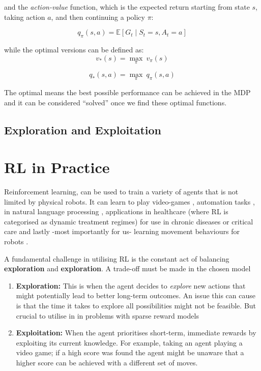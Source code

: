     and the \emph{action-value} function, which is the expected return starting from state $s$, taking action $a$, and then continuing a policy $\pi$:

    \[ q_\pi \left(s, a\right) = \mathbb{E} \left[ G_t \mid S_t = s, A_t = a\right]\]


    while the optimal versions can be defined as:
    \[v_* \left(s\right) = \underset{\pi}{\max} \ v_\pi \left(s\right)\]

    \[q_* \left(s, a\right) = \underset{\pi}{\max} \ q_\pi \left(s, a\right)\]
    
    The optimal means the best possible performance can be achieved in the MDP and it can be considered ``solved'' once we find these optimal functions.


    \subsection{Exploration and Exploitation}

\section{RL in Practice}
  Reinforcement learning, can be used to train a variety of agents that is not limited by physical robots. It can learn to play video-games \cite{comi2018}, automation tasks \cite{}, in natural language processing \cite{paulus2017deepreinforcedmodelabstractive}, applications  in healthcare (where RL is categorised as dynamic treatment regimes) for use in chronic diseases or critical care \cite{yu2020reinforcementlearninghealthcaresurvey} and lastly -most importantly for us- learning movement behaviours for robots \cite{}.
  
  A fundamental challenge in utilising RL is the constant act of balancing \textbf{exploration} and \textbf{exploration}. A trade-off must be made in the chosen model 
  \begin{enumerate}
    \item \textbf{Exploration:}
    This is when the agent decides to \emph{explore} new actions that might potentially lead to better long-term outcomes. An issue this can cause is that the time it takes to explore all possibilities might not be feasible. But crucial to utilise in in problems with sparse reward models \cite{}
    \item \textbf{Exploitation:}
    When the agent prioritises short-term, immediate rewards by exploiting its current knowledge. For example, taking an agent playing a video game; if a high score was found the agent might be unaware that a higher score can be achieved with a different set of moves. 
  \end{enumerate}

